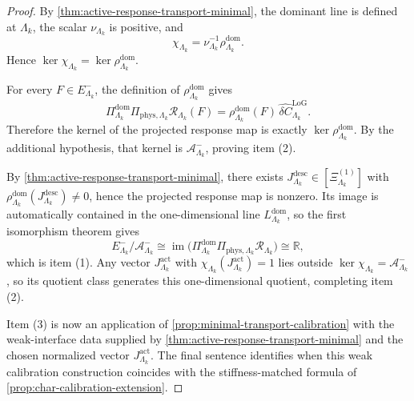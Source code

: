 \documentclass[11pt]{article}
\begin{document}
\begin{proof}
By \cref{thm:active-response-transport-minimal}, the dominant line is defined at \(\Lambda_k\), the
scalar \(\nu_{\Lambda_k}\) is positive, and
\[
\chi_{\Lambda_k}
=
\nu_{\Lambda_k}^{-1}\rho^{\mathrm{dom}}_{\Lambda_k}.
\]
Hence
\(
\ker\chi_{\Lambda_k}=\ker\rho^{\mathrm{dom}}_{\Lambda_k}
\).

For every \(F\in E^-_{\Lambda_k}\), the definition of \(\rho^{\mathrm{dom}}_{\Lambda_k}\) gives
\[
\Pi^{\mathrm{dom}}_{\Lambda_k}\Pi_{\mathrm{phys},\Lambda_k}\mathcal R_{\Lambda_k}(F)
=
\rho^{\mathrm{dom}}_{\Lambda_k}(F)\,
\widehat{\delta C}^{\mathrm{LoG}}_{\Lambda_k}.
\]
Therefore the kernel of the projected response map is exactly
\(
\ker\rho^{\mathrm{dom}}_{\Lambda_k}
\).
By the additional hypothesis, that kernel is \(\mathcal A^-_{\Lambda_k}\), proving item (2).

By \cref{thm:active-response-transport-minimal}, there exists
\(
J^{\mathrm{desc}}_{\Lambda_k}\in[\Xi^{(1)}_{\Lambda_k}]
\)
with
\(
\rho^{\mathrm{dom}}_{\Lambda_k}(J^{\mathrm{desc}}_{\Lambda_k})\neq 0
\),
hence the projected response map is nonzero.
Its image is automatically contained in the one-dimensional line
\(
L^{\mathrm{dom}}_{\Lambda_k}
\),
so the first isomorphism theorem gives
\[
E^-_{\Lambda_k}/\mathcal A^-_{\Lambda_k}
\cong
\operatorname{im}\!\big(
\Pi^{\mathrm{dom}}_{\Lambda_k}\Pi_{\mathrm{phys},\Lambda_k}\mathcal R_{\Lambda_k}
\big)
\cong
\mathbb R,
\]
which is item (1).
Any vector \(J^{\mathrm{act}}_{\Lambda_k}\) with \(\chi_{\Lambda_k}(J^{\mathrm{act}}_{\Lambda_k})=1\)
lies outside \(\ker\chi_{\Lambda_k}=\mathcal A^-_{\Lambda_k}\), so its quotient class generates this
one-dimensional quotient, completing item (2).

Item (3) is now an application of \cref{prop:minimal-transport-calibration} with the weak-interface
data supplied by \cref{thm:active-response-transport-minimal} and the chosen normalized vector
\(J^{\mathrm{act}}_{\Lambda_k}\).
The final sentence identifies when this weak calibration construction coincides with the
stiffness-matched formula of \cref{prop:char-calibration-extension}.
\end{proof}

\ifdefined\UOMTransportFragmentLoaded\else
\end{document}
